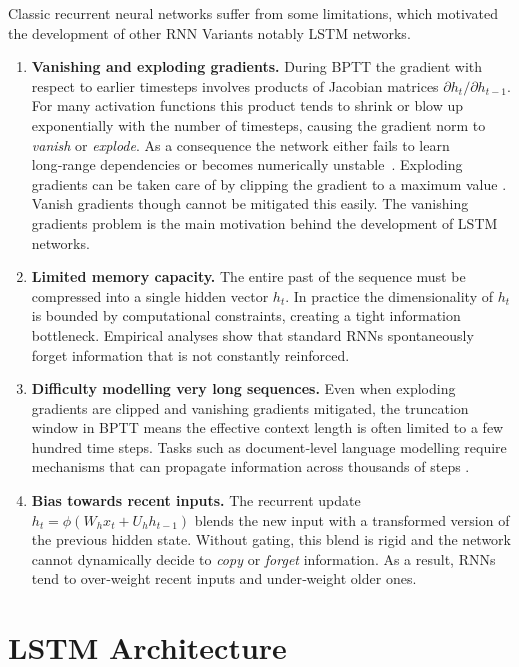 \documentclass[twoside,a4paper,10pt,DIV=12,BCOR=12mm]{scrartcl}
\begin{document}
Classic recurrent neural networks suffer from some limitations, which motivated the development 
of other RNN Variants notably LSTM networks.

\begin{enumerate}[label=(\roman*)]
\item \textbf{Vanishing and exploding gradients.}  During BPTT the gradient with respect to earlier timesteps involves products of Jacobian
  matrices $\partial h_t/\partial h_{t-1}$.  For many activation functions this product tends to shrink or blow up exponentially with
  the number of timesteps, causing the gradient norm to \emph{vanish} or \emph{explode}.
  As a consequence the network either fails to learn long‑range dependencies or becomes numerically unstable~\cite{hochreiter1997lstm,pascanu2013rnntraining}.
  Exploding gradients can be taken care of by clipping the gradient to a maximum value \cite{pascanu2013rnntraining}.
  Vanish gradients though cannot be mitigated this easily. The vanishing gradients problem is the main motivation behind the
  development of LSTM networks.
\item \textbf{Limited memory capacity.}  The entire past of the sequence must be compressed into a single hidden vector $h_t$.
  In practice the dimensionality of $h_t$ is bounded by computational constraints, creating a tight information bottleneck.
  Empirical analyses show that standard RNNs spontaneously forget information that is not constantly reinforced.
\item \textbf{Difficulty modelling very long sequences.}  Even when exploding gradients are clipped and vanishing 
  gradients mitigated, the truncation window in BPTT means the effective context length is often limited to a few hundred
  time steps.  Tasks such as document‑level language modelling require mechanisms that can propagate information across thousands of steps \cite{pascanu2013rnntraining}.
\item \textbf{Bias towards recent inputs.}  The recurrent update $h_t=\phi(W_h x_t + U_h h_{t-1})$ blends the new input with a 
  transformed version of the previous hidden state.  Without gating, this blend is rigid and the network cannot dynamically decide 
  to \emph{copy} or \emph{forget} information.  As a result, RNNs tend to over‑weight recent inputs and under‑weight older ones.
\end{enumerate}

\section{LSTM Architecture}
\end{document}
